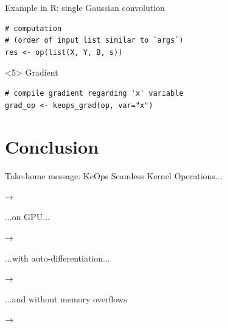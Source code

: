 \documentclass[12pt,aspectratio=1610]{beamer}
\begin{document}
\begin{frame}[fragile]{Example in R: single Gaussian convolution}
\begin{onlyenv}
\begin{verbatim}
# computation
# (order of input list similar to `args`)
res <- op(list(X, Y, B, s))
\end{verbatim}
\end{onlyenv}

\begin{onlyenv}<5>
Gradient
\begin{verbatim}
# compile gradient regarding 'x' variable
grad_op <- keops_grad(op, var="x")
\end{verbatim}
\end{onlyenv}

\end{frame}

\section{Conclusion}


\begin{frame}{Take-home message: KeOps}
\small
Seamless Kernel Operations...\medskip

\hspace{0.5cm} $\rightarrow$ \medskip

...on GPU...\medskip

\hspace{0.5cm} $\rightarrow$ \medskip

...with auto-differentiation...\medskip

\hspace{0.5cm} $\rightarrow$ \medskip

...and without memory overflows\medskip

\hspace{0.5cm} $\rightarrow$ 
\end{frame}
\end{document}
